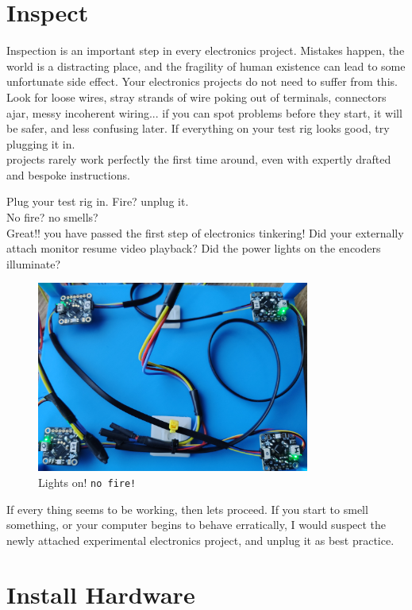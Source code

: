 \documentclass[]{article}
\begin{document}
\section*{Inspect}
Inspection is an important step in every electronics project. Mistakes happen, the world is a distracting place, and the fragility of human existence can lead to some unfortunate side effect. Your electronics projects do not need to suffer from this. Look for loose wires, stray strands of wire poking out of terminals, connectors ajar,  messy incoherent wiring... if you can spot problems before they start, it will be safer, and less confusing later. If everything on your test rig looks good, try plugging it in.\\ projects rarely work perfectly the first time around, even with expertly drafted and bespoke instructions. 

Plug your test rig in. Fire? unplug it.\\No fire? no smells? \\ Great!! you have passed the first step of electronics tinkering!
Did your externally attach monitor resume video playback? Did the power lights on the encoders illuminate?

\begin{figure}[ht]
	\centering
	\includegraphics[width=0.8\textwidth]{noFire.png}
	\caption{Lights on! \texttt{no fire!} }
	\label{fig:looks_good}
\end{figure}

If every thing seems to be working, then lets proceed. 
If you start to smell something, or your computer begins to behave erratically, I would suspect the newly attached experimental electronics project, and unplug it as best practice. 
 
\section*{Install Hardware}
\end{document}

